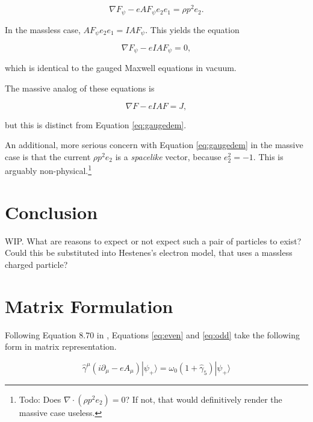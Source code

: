 \documentclass{article}
\begin{document}
    \begin{equation}
      \nabla F_\psi - e A F_\psi e_2e_1 = \rho p^2 e_2.\label{eq:gaugedem}
    \end{equation}

    In the massless case, $A F_\psi e_2 e_1 = I A F_\psi$. This yields the equation 

    \begin{equation}
      \nabla F_\psi - e I A F_\psi = 0,
    \end{equation}

    which is identical to the gauged Maxwell equations in vacuum.\cite{duality}\cite{malik}\cite{tiwari}

    The massive analog of these equations is \cite{tiwari}

    \begin{equation}
      \nabla F - e I A F = J,
    \end{equation}

    but this is distinct from Equation \ref{eq:gaugedem}. 

    An additional, more serious concern with Equation \ref{eq:gaugedem} in the massive case is that the current $\rho p^2 e_2$ is a \emph{spacelike} vector, because $e_2^2 = -1$. This is arguably non-physical.\footnote{Todo: Does $\nabla \cdot (\rho p^2 e_2) = 0$? If not, that would definitively render the massive case useless.}

  \section{Conclusion}

  WIP. What are reasons to expect or not expect such a pair of particles to exist? Could this be substituted into Hestenes's electron model, that uses a massless charged particle?

  \newpage

  \appendix

  \section{Matrix Formulation} \label{matrix}

  Following Equation 8.70 in \cite{gap}, Equations \ref{eq:even} and \ref{eq:odd} take the following form in matrix representation.

  \begin{equation}
    \hat \gamma^\mu (i \partial_\mu - e A_\mu) | \psi_+ \rangle = \omega_0 (1 + \hat \gamma_5) | \psi_+ \rangle
  \end{equation}
\end{document}
